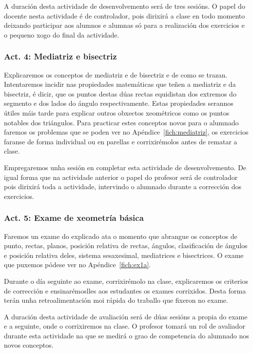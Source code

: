 A duración desta actividade de desenvolvemento será de tres sesións. O papel do docente nesta actividade é de controlador, pois dirixirá a clase en todo momento deixando participar aos alumnos e alumnas só para a realización dos exercicios e o pequeno xogo do final da actividade.

\subsubsection{Act. 4: Mediatriz e bisectriz}\label{act:mediatriz}
Explicaremos os conceptos de mediatriz e de bisectriz e de como se trazan. Intentaremos incidir nas propiedades matemáticas que teñen a mediatriz e da bisectriz, é dicir, que os puntos destas dúas rectas equidistan dos extremos do segmento e dos lados do ángulo respectivamente. Estas propiedades serannos útiles máis tarde para explicar outros obxectos xeométricos como os puntos notables dos triángulos. Para practicar estes conceptos novos para o alumnado faremos os problemas que se poden ver no Apéndice~\ref{fich:mediatriz}, os exercicios faranse de forma individual ou en parellas e corrixirémolos antes de rematar a clase.

Empregaremos unha sesión en completar esta actividade de desenvolvemento. De igual forma que na actividade anterior o papel do profesor será de controlador pois dirixirá toda a actividade, intervindo o alumnado durante a corrección dos exercicios.

\subsubsection{Act. 5: Exame de xeometría básica}\label{act:examen1}
Faremos un exame do explicado ata o momento que abrangue os conceptos de punto, rectas, planos, posición relativa de rectas, ángulos, clasificación de ángulos e posición relativa deles, sistema sesaxesimal, mediatrices e bisectrices. O exame que puxemos pódese ver no Apéndice~\ref{fich:ex1a}.

Durante o día seguinte ao exame, corrixirémolo na clase, explicaremos os criterios de corrección e ensinarémoslles aos estudantes os exames corrixidos. Desta forma terán unha retroalimentación moi rápida do traballo que fixeron no exame.

A duración desta actividade de avaliación será de dúas sesións a propia do exame e a seguinte, onde o corrixiremos na clase. O profesor tomará un rol de avaliador durante esta actividade na que se medirá o grao de competencia do alumnado nos novos conceptos.

